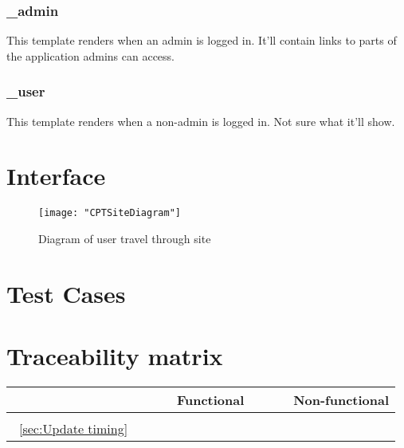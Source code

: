 \documentclass[12pt]{article}
\renewcommand{\c}{\checkmark}
\newcommand{\s}[1] {\begin{sideways}#1\end{sideways}}
\begin{document}
\subsubsection{\_admin}
This template renders when an admin is logged in. It'll contain links to parts of the application admins can access.
\subsubsection{\_user}
This template renders when a non-admin is logged in. Not sure what it'll show.


\section{Interface}
\begin{figure}[H]
\begin{center}
\texttt{[image: "CPTSiteDiagram"]}
\caption{Diagram of user  travel through site}
\label{fig:dia}
\end{center}
\end{figure}
\section{Test Cases}


\section{Traceability matrix}
\begin{center}
\begin{tabular}{|l||*{12}{c|}|*{4}{c|}}
\hline
\multicolumn{1}{|c||}{ }&
\multicolumn{12}{|c||}{Functional} &
\multicolumn{4}{|c|}{Non-functional}\\
\hline
	& \s{} & \\
\hline
\hline
~\ref{sec:Update timing}	&	\c \\
\hline
\end{tabular}
\end{center}
\end{document}
